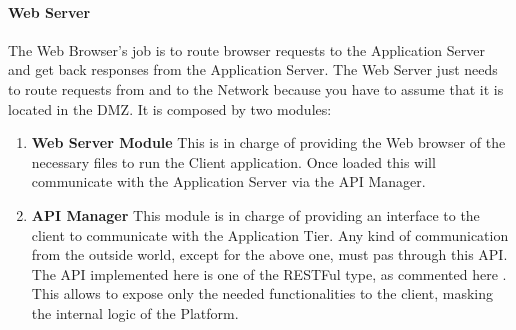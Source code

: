 \paragraph{Web Server}
The Web Browser's job is to route browser requests to the Application Server and get back responses from the Application Server. The Web Server just needs to route requests from and to the Network because you have to assume 
that it is located in the DMZ. It is composed by two modules:
\begin{enumerate}[label=$\bullet$]
    \item \textbf{Web Server Module} This is in charge of providing the Web browser of the necessary files to run the Client application. Once loaded this will communicate with the Application Server via the API Manager.
    \item \textbf{API Manager} This module is in charge of providing an interface to the client to communicate with the Application Tier. 
    Any kind of communication from the outside world, except for the above one, must pas through this API. 
    The API implemented here is one of the RESTFul type, as commented here .
    This allows to expose only the needed functionalities to the client, masking the internal logic of the Platform.
\end{enumerate}
\newpage

